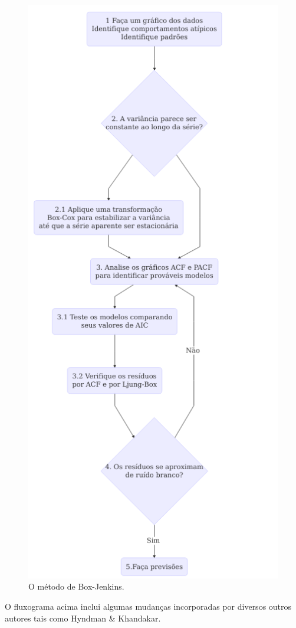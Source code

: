 \documentclass[
	12pt,				%
	openright,			%
	oneside,			%
	a4paper,			%
	english,			%
	french,				%
	spanish,			%
	brazil				%
	]{abntex2}
\begin{document}
\begin{figure}[h]
    \centering
	\includegraphics[scale=0.7]{boxjenkins}
	\caption{O método de Box-Jenkins.}
\end{figure}
\FloatBarrier

O fluxograma acima inclui algumas mudanças incorporadas por diversos outros autores tais como Hyndman \& Khandakar.
\end{document}
